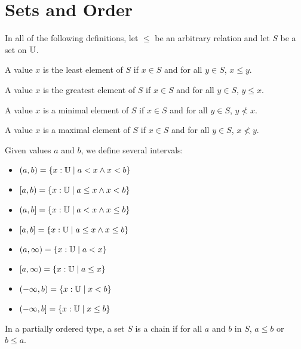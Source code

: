 \documentclass[../../math.tex]{subfiles}
\begin{document}
\section{Sets and Order}

In all of the following definitions, let $\leq$ be an arbitrary relation and let
$S$ be a set on $\mathbb{U}$.

\begin{definition}
    A value $x$ is the least element of $S$ if $x \in S$ and for all $y \in S$,
    $x \leq y$.
\end{definition}

\begin{definition}
    A value $x$ is the greatest element of $S$ if $x \in S$ and for all $y \in
    S$, $y \leq x$.
\end{definition}

\begin{definition}
    A value $x$ is a minimal element of $S$ if $x \in S$ and for all $y \in S$,
    $y \nless x$.
\end{definition}

\begin{definition}
    A value $x$ is a maximal element of $S$ if $x \in S$ and for all $y \in S$,
    $x \nless y$.
\end{definition}

\begin{definition}
    Given values $a$ and $b$, we define several intervals:
    \begin{itemize}
        \item $(a, b) = \{x : \mathbb{U} \mid a < x \wedge x < b\}$
        \item $[a, b) = \{x : \mathbb{U} \mid a \leq x \wedge x < b\}$
        \item $(a, b] = \{x : \mathbb{U} \mid a < x \wedge x \leq b\}$
        \item $[a, b] = \{x : \mathbb{U} \mid a \leq x \wedge x \leq b\}$
        \item $(a, \infty) = \{x : \mathbb{U} \mid a < x\}$
        \item $[a, \infty) = \{x : \mathbb{U} \mid a \leq x\}$
        \item $(-\infty, b) = \{x : \mathbb{U} \mid x < b\}$
        \item $(-\infty, b] = \{x : \mathbb{U} \mid x \leq b\}$
    \end{itemize}
\end{definition}

\begin{definition}
    In a partially ordered type, a set $S$ is a chain if for all $a$ and $b$ in
    $S$, $a \leq b$ or $b \leq a$.
\end{definition}
\end{document}
